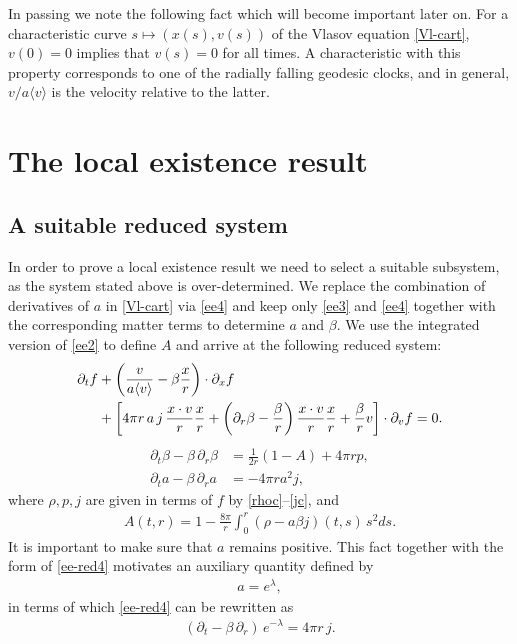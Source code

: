\documentclass[11pt]{article}
\def\p0{\langle v \rangle}
\begin{document}
In passing we note the following fact which will become important later on.
For a characteristic curve $s\mapsto (x(s),v(s))$ of the Vlasov equation
\eqref{Vl-cart}, $v(0)=0$  implies that $v(s)=0$ for all times.
A characteristic with this property corresponds to one of the radially
falling geodesic clocks, and in general, $v/a \p0$ is the velocity relative
to the latter.
%
%
\section{The local existence result}
\label{section_locex_form} 
\setcounter{equation}{0}
%
%
\subsection{A suitable reduced system}
%
%
In order to prove a local existence result we
need to select a suitable subsystem, as the system stated above is
over-determined.
We replace the combination of derivatives of $a$
in \eqref{Vl-cart} via \eqref{ee4} and keep only
\eqref{ee3} and \eqref{ee4} together with the corresponding
matter terms to determine $a$ and $\beta$.
We use the integrated version of \eqref{ee2} to define $A$
and arrive at the following reduced system:
\begin{align}\label{Vl-red}
  \partial_t f
  &+
  \left(\frac{v}{a \p0}-\beta\frac{x}{r}\right)\cdot \partial_x f\notag \\
  & {}+ \left[4\pi r \,a\, j\, \frac{x\cdot v}{r} \frac{x}{r}
    +\left(\partial_r\beta-\frac{\beta}{r}\right)\frac{x\cdot v}{r} \frac{x}{r}
    +\frac{\beta}{r} v\right]
  \cdot\partial_v f=0.
\end{align}
\begin{align}
  \partial_t\beta-\beta\,\partial_r\beta
  &=
  \frac{1}{2r}(1-A)+4\pi rp,\label{ee-red3}\\
  \partial_t a -\beta\, \partial_r a
  &=
  - 4\pi r a^2 j,\label{ee-red4}
\end{align}
where $\rho, p, j$ are given in terms of $f$ by \eqref{rhoc}--\eqref{jc},
and
\begin{align} \label{Adef-red}
  A(t,r) = 1-\frac{8\pi}{r}\int_0^r\left(\rho - a \beta j\right)(t,s)\,s^2 ds.
\end{align}
It is important to make sure that $a$ remains positive.
This fact together with the form of \eqref{ee-red4} motivates an
auxiliary quantity defined by
\begin{align} \label{lambdadef}
  a = e^\lambda,
\end{align}
in terms of which \eqref{ee-red4} can be rewritten as
\begin{align} \label{ee-red4-lambda}
  \left(\partial_t - \beta\, \partial_r\right)\, e^{-\lambda} = 4 \pi r\, j.
\end{align}
%
%
\end{document}
